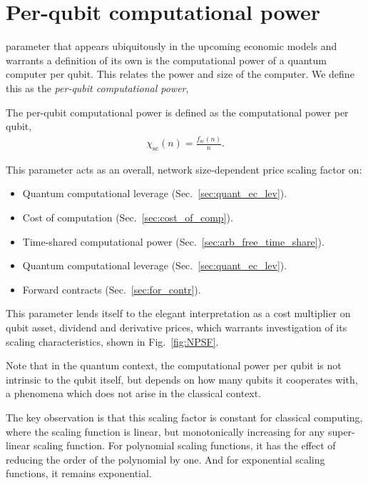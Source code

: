 \section{Per-qubit computational power}\label{sec:NPSF}

 parameter that appears ubiquitously in the upcoming economic models and warrants a definition of its own is the computational power of a quantum computer per qubit. This relates the power and size of the computer. We define this as the \textit{per-qubit computational power},

\begin{definition}\label{def:NPSF}
The per-qubit computational power is defined as the computational power per qubit,
\begin{align}
\chi_\mathrm{sc}(n) = \frac{f_\mathrm{sc}(n)}{n}.
\end{align}
\end{definition}

This parameter acts as an overall, network size-dependent price scaling factor on:
\begin{itemize}
\item Quantum computational leverage (Sec.~\ref{sec:quant_ec_lev}).
\item Cost of computation (Sec.~\ref{sec:cost_of_comp}).
\item Time-shared computational power (Sec.~\ref{sec:arb_free_time_share}).
\item Quantum computational leverage (Sec.~\ref{sec:quant_ec_lev}).
\item Forward contracts (Sec.~\ref{sec:for_contr}).
\end{itemize}

This parameter lends itself to the elegant interpretation as a cost multiplier on qubit asset, dividend and derivative prices, which warrants investigation of its scaling characteristics, shown in Fig.~\ref{fig:NPSF}. 

Note that in the quantum context, the computational power per qubit is not intrinsic to the qubit itself, but depends on how many qubits it cooperates with, a phenomena which does not arise in the classical context.

The key observation is that this scaling factor is constant for classical computing, where the scaling function is linear, but monotonically increasing for any super-linear scaling function. For polynomial scaling functions, it has the effect of reducing the order of the polynomial by one. And for exponential scaling functions, it remains exponential.

